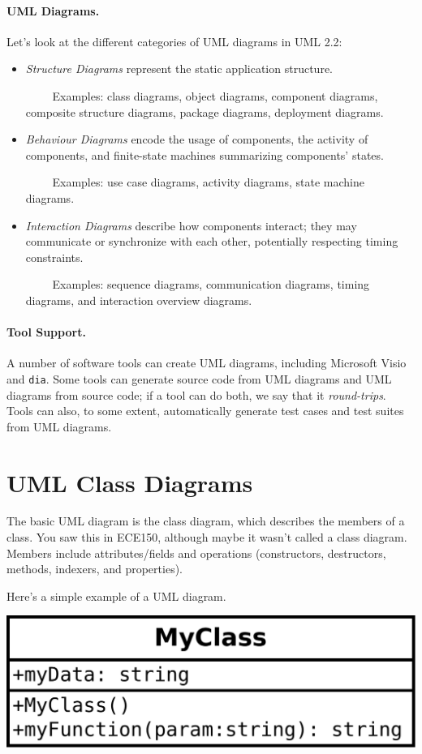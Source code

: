 \paragraph{UML Diagrams.}
Let's look at the different categories of UML diagrams in UML 2.2:
\begin{itemize}
\item \emph{Structure Diagrams} represent the static application structure.

$\qquad$ Examples: class diagrams, object diagrams, component diagrams,
composite structure diagrams, package diagrams, deployment diagrams.

\item \emph{Behaviour Diagrams} encode the usage of components,
the activity of components, and finite-state machines summarizing components'
states.

$\qquad$ Examples: use case diagrams, activity diagrams, state machine diagrams.

\item \emph{Interaction Diagrams} describe how components interact;
  they may communicate or synchronize with each other, potentially
  respecting timing constraints.  

$\qquad$ Examples: sequence diagrams, communication diagrams, timing diagrams,
and interaction overview diagrams.
\end{itemize}

\paragraph{Tool Support.} A number of software tools can create UML diagrams,
including Microsoft Visio and {\tt dia}. Some tools can generate
source code from UML diagrams and UML diagrams from source code; if a
tool can do both, we say that it \emph{round-trips}. Tools can also,
to some extent, automatically generate test cases and test suites from
UML diagrams.

\section*{UML Class Diagrams}
The basic UML diagram is the class diagram, which describes the members of
a class. You saw this in ECE150, although maybe it wasn't called a class
diagram. Members include attributes/fields and operations (constructors,
destructors, methods, indexers, and properties).

Here's a simple example of a UML diagram.
\begin{center}
\includegraphics[width=.6\textwidth]{images/myclass.pdf}
\end{center}

